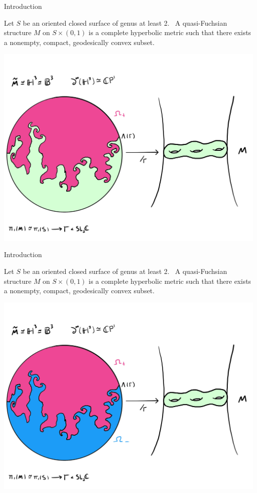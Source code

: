 \documentclass[professionalfont]{beamer}
\begin{document}



\begin{frame}{Introduction}

Let $S$ be an oriented closed surface of genus at least 2.  \ A quasi-Fuchsian structure $M$ on $S \times (0,1)$ is a complete hyperbolic metric such that there exists a nonempty, compact, geodesically convex subset.


\centering\includegraphics[scale=0.09]{QF-6.jpg}
	


\end{frame}





\begin{frame}{Introduction}

Let $S$ be an oriented closed surface of genus at least 2.  \ A quasi-Fuchsian structure $M$ on $S \times (0,1)$ is a complete hyperbolic metric such that there exists a nonempty, compact, geodesically convex subset.


\centering\includegraphics[scale=0.09]{QF-7.jpg}
	


\end{frame}
\end{document}
